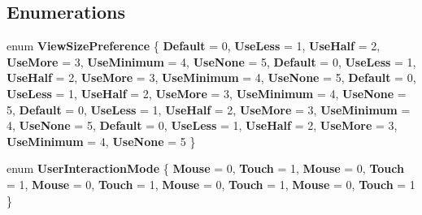 \subsection*{Enumerations}
\begin{DoxyCompactItemize}
\item 
\mbox{\label{namespace_windows_1_1_u_i_1_1_view_management_aa4519c5469b746d5898bd904a05a819a}} 
enum {\bfseries View\+Size\+Preference} \{ \newline
{\bfseries Default} = 0, 
{\bfseries Use\+Less} = 1, 
{\bfseries Use\+Half} = 2, 
{\bfseries Use\+More} = 3, 
\newline
{\bfseries Use\+Minimum} = 4, 
{\bfseries Use\+None} = 5, 
{\bfseries Default} = 0, 
{\bfseries Use\+Less} = 1, 
\newline
{\bfseries Use\+Half} = 2, 
{\bfseries Use\+More} = 3, 
{\bfseries Use\+Minimum} = 4, 
{\bfseries Use\+None} = 5, 
\newline
{\bfseries Default} = 0, 
{\bfseries Use\+Less} = 1, 
{\bfseries Use\+Half} = 2, 
{\bfseries Use\+More} = 3, 
\newline
{\bfseries Use\+Minimum} = 4, 
{\bfseries Use\+None} = 5, 
{\bfseries Default} = 0, 
{\bfseries Use\+Less} = 1, 
\newline
{\bfseries Use\+Half} = 2, 
{\bfseries Use\+More} = 3, 
{\bfseries Use\+Minimum} = 4, 
{\bfseries Use\+None} = 5, 
\newline
{\bfseries Default} = 0, 
{\bfseries Use\+Less} = 1, 
{\bfseries Use\+Half} = 2, 
{\bfseries Use\+More} = 3, 
\newline
{\bfseries Use\+Minimum} = 4, 
{\bfseries Use\+None} = 5
 \}
\item 
\mbox{\label{namespace_windows_1_1_u_i_1_1_view_management_a164710c9a26d432f77ce83ece619738d}} 
enum {\bfseries User\+Interaction\+Mode} \{ \newline
{\bfseries Mouse} = 0, 
{\bfseries Touch} = 1, 
{\bfseries Mouse} = 0, 
{\bfseries Touch} = 1, 
\newline
{\bfseries Mouse} = 0, 
{\bfseries Touch} = 1, 
{\bfseries Mouse} = 0, 
{\bfseries Touch} = 1, 
\newline
{\bfseries Mouse} = 0, 
{\bfseries Touch} = 1
 \}
\item 
\mbox{\label{namespace_windows_1_1_u_i_1_1_view_management_aa4519c5469b746d5898bd904a05a819a}} 

\end{DoxyCompactItemize}
